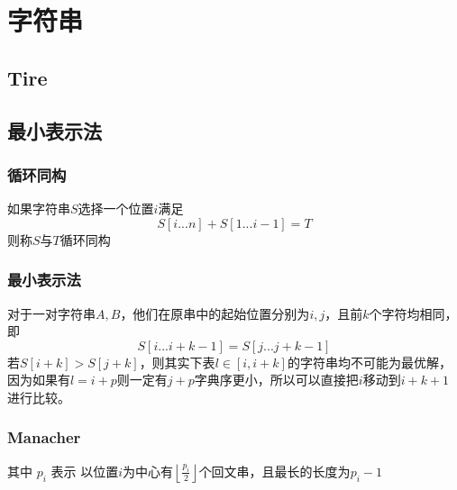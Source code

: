 \chapter{字符串}






\section{Tire}




\section{最小表示法}

\subsection{循环同构}
如果字符串$S$选择一个位置$i$满足
$$
S[i...n]+S[1...i-1] = T
$$
则称$S$与$T$循环同构

\subsection{最小表示法}
对于一对字符串$A,B$，他们在原串中的起始位置分别为$i,j$，且前$k$个字符均相同，即
$$
S[i...i+k-1] =S[j...j+k-1]
$$
若$S[i+k]>S[j+k]$，则其实下表$l\in[i,i+k]$的字符串均不可能为最优解，因为如果有$l=i+p$则一定有$j+p$字典序更小，所以可以直接把$i$移动到$i+k+1$进行比较。



\subsection{Manacher}

其中 $p_i$ 表示 以位置$i$为中心有$\left \lfloor \frac{p_i}{2} \right \rfloor $个回文串，且最长的长度为$p_i-1$

